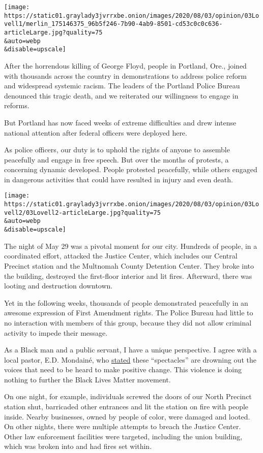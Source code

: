 \texttt{[image: https://static01.graylady3jvrrxbe.onion/images/2020/08/03/opinion/03Lovell1/merlin\_175146375\_96b5f246-7b90-4ab9-8501-cd53c0c0c636-articleLarge.jpg?quality=75\\\&auto=webp\\\&disable=upscale]}

After the horrendous killing of George Floyd, people in Portland, Ore.,
joined with thousands across the country in demonstrations to address
police reform and widespread systemic racism. The leaders of the
Portland Police Bureau denounced this tragic death, and we reiterated
our willingness to engage in reforms.

But Portland has now faced weeks of extreme difficulties and drew
intense national attention after federal officers were deployed here.

As police officers, our duty is to uphold the rights of anyone to
assemble peacefully and engage in free speech. But over the months of
protests, a concerning dynamic developed. People protested peacefully,
while others engaged in dangerous activities that could have resulted in
injury and even death.

\texttt{[image: https://static01.graylady3jvrrxbe.onion/images/2020/08/03/opinion/03Lovell2/03Lovell2-articleLarge.jpg?quality=75\\\&auto=webp\\\&disable=upscale]}

The night of May 29 was a pivotal moment for our city. Hundreds of
people, in a coordinated effort, attacked the Justice Center, which
includes our Central Precinct station and the Multnomah County Detention
Center. They broke into the building, destroyed the first-floor interior
and lit fires. Afterward, there was looting and destruction downtown.

Yet in the following weeks, thousands of people demonstrated peacefully
in an awesome expression of First Amendment rights. The Police Bureau
had little to no interaction with members of this group, because they
did not allow criminal activity to impede their message.

As a Black man and a public servant, I have a unique perspective. I
agree with a local pastor, E.D. Mondainé, who
\href{https://www.washingtonpost.com/opinions/2020/07/23/portlands-protests-were-supposed-be-about-black-lives-now-theyre-white-spectacle/}{stated}
these ``spectacles'' are drowning out the voices that need to be heard
to make positive change. This violence is doing nothing to further the
Black Lives Matter movement.

On one night, for example, individuals screwed the doors of our North
Precinct station shut, barricaded other entrances and lit the station on
fire with people inside. Nearby businesses, owned by people of color,
were damaged and looted. On other nights, there were multiple attempts
to breach the Justice Center. Other law enforcement facilities were
targeted, including the union building, which was broken into and had
fires set within.

